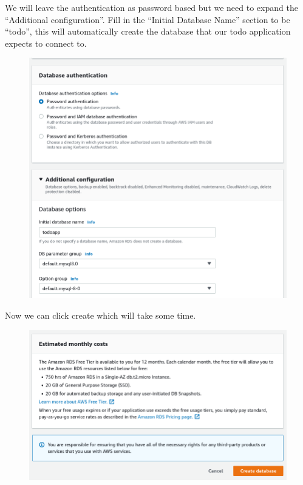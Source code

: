 \documentclass{csse4400}
\begin{document}
We will leave the authentication as password based but we need to expand the ``Additional configuration''.
Fill in the ``Initial Database Name'' section to be ``todo'',
this will automatically create the database that our todo application expects to connect to.


\begin{figure}[H]
  \includegraphics[width=\textwidth]{images/db7}
\end{figure}

Now we can click create which will take some time.

\begin{figure}[H]
  \includegraphics[width=\textwidth]{images/db8}
\end{figure}
\end{document}
